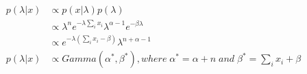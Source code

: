 \begin{align*}
    p(\lambda |x) &\propto p(x|\lambda)p(\lambda) \\
    &\propto \lambda^ne^{-\lambda \sum_i x_i} \lambda^{\alpha -1}e^{-\beta \lambda} \\
    &\propto e^{-\lambda(\sum_ix_i-\beta)}\lambda^{n+\alpha-1} \\
    p(\lambda |x) &\propto Gamma(\alpha^*, \beta^*), where \; \alpha^* = \alpha +n \; and \; \beta^* =\sum_ix_i+\beta
\end{align*}


